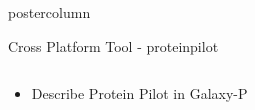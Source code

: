 \documentclass[final]{beamer}
\begin{document}
\begin{frame}
\begin{columns}
\begin{column}{.33\textwidth}
\begin{beamercolorbox}[center,wd=\textwidth]{postercolumn}
\begin{minipage}[T]{.98\textwidth}
{\begin{block}{Cross Platform Tool - proteinpilot}
\begin{columns}
                  \begin{column}{.60\textwidth}
                    \begin{itemize}
                      \item Describe Protein Pilot in Galaxy-P
                    \end{itemize}
                  \end{column}              
                \end{columns}
              \end{block}
            }
          \end{minipage}
        \end{beamercolorbox}
      \end{column}              
    \end{columns}   
  \end{frame}
\end{document}
